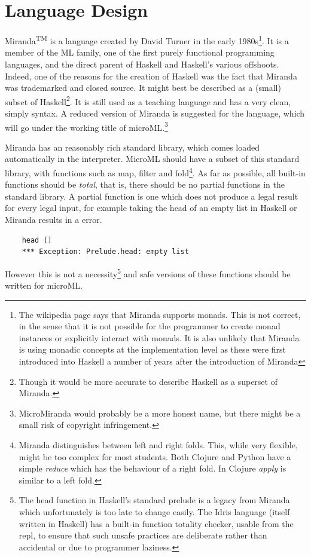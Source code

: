 \documentclass[12pt, a4paper]{report}
\begin{document}
\section{Language Design} 
\label{sec:lang}
Miranda\textsuperscript{TM} is a language
created by David Turner in the early 1980s\footnote{The wikipedia page says that Miranda supports
monads. This is not correct, in the sense that it is not possible for the programmer to create
monad instances or explicitly interact with monads. It is also unlikely that Miranda is using
monadic concepts at the implementation level as these were first introduced into Haskell a number of
years after the introduction of Miranda}. It is a member of the ML family, one of the first purely
functional programming languages, and the direct parent of Haskell and Haskell's various offshoots.
Indeed, one of the reasons for the creation of Haskell was the fact that Miranda was trademarked and
closed source. It might best be described as a (small) subset of Haskell\footnote{Though it would
be more accurate to describe Haskell as a superset of Miranda.}. It is still used as a teaching
language and has a very clean, simply syntax. A reduced version of Miranda is suggested for 
the language, which will go under the working title of microML.\footnote{MicroMiranda would probably be
a more honest name, but there might be a small risk of copyright infringement.}

Miranda has an reasonably rich standard library, which comes loaded automatically in the
interpreter. MicroML should have a subset of this standard library, with functions such as
map, filter and fold\footnote{Miranda distinguishes between left and right folds. This, while
very flexible, might be too complex for most students. Both Clojure and Python have a simple
\textit{reduce} which has the behaviour of a right fold. In Clojure \textit{apply} is similar to
a left fold.}. As far as possible, all built-in functions should be \textit{total}, that is, there
should be no partial functions in the standard library. A partial function is one which does not
produce a legal result for every legal input, for example taking the head of an empty list in
Haskell or Miranda results in a error.

\begin{verbatim}
    head []
    *** Exception: Prelude.head: empty list
\end{verbatim} 

However this is not a necessity\footnote{The head function in Haskell's standard prelude is a legacy
from Miranda which unfortunately is too late to change easily. The Idris language (itself written in
Haskell) has a built-in function \gls{totality} checker, usable from the repl, to ensure that such unsafe
practices are deliberate rather than accidental or due to programmer laziness.} and safe versions of
these functions should be written for microML\@.
\end{document}
